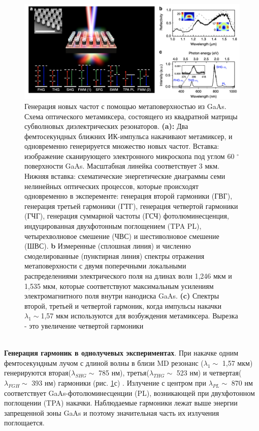 \begin{figure}[h!]
	\centering
	\includegraphics[width=0.7\linewidth]{images/mixer.png}
	\caption{Генерация новых частот с помощью метаповерхностью из  GaAs. Схема оптического метамиксера, состоящего из квадратной матрицы субволновых диэлектрических резонаторов. \textbf{(a):} Два фемтосекундных ближних ИК-импульса накачивают метамиксер, и одновременно генерируется множество новых частот. Вставка: изображение сканирующего электронного микроскопа под углом 60 $^\circ$ поверхности GaAs. Масштабная линейка соответствует 3 мкм. Нижняя вставка: схематические энергетические диаграммы семи нелинейных оптических процессов, которые происходят одновременно в эксперементе: генерация второй гармоники (ГВГ), генерация третьей гармоники (ГТГ), генерация четвертой гармоники (ГЧГ), генерация суммарной частоты (ГСЧ) фотолюминесценция, индуцированная двухфотонным поглощением (TPA PL), четырехволновое смешение (ЧВС) и шестиволновое смешение (ШВС). \textbf{b} Измеренные (сплошная линия) и численно смоделированные (пунктирная линия) спектры отражения метаповерхности с двумя поперечными локальными распределениями электрического поля на длинах волн 1,246 мкм и 1,535 мкм, которые соответствуют максимальным усилениям электромагнитного поля внутри нанодиска GaAs. \textbf{(c)} Спектры второй, третьей и четвертой гармоник, когда импульсы накачки $\lambda_1 \sim $1,57 мкм используются для возбуждения метамиксера. Вырезка - это увеличение четвертой гармоники \cite{liu2018all}}
	\label{mixerPictr1}
\end{figure}
\\
\hspace*{2mm}
\textbf{Генерация гармоник в однолучевых экспериментах}. При накачке одним фемтосекундным лучом с длиной волны в близи MD резонанс ($\lambda_1 \sim$ 1,57 мкм)  генерируются вторая($\lambda_{SHG} \sim$ 785 нм), третья($\lambda_{THG} \sim$ 523 нм) и четвертая($\lambda_{FGH} \sim$ 393 нм) гармоники (рис. \ref{mixerPictr1}с) . Излучение с центром при $\lambda_{PL} \sim$ 870 нм соответствует GaAs-фотолюминесценции (PL), возникающей при двухфотонном поглощении (TPA) накачки. Наблюдаемые гармоники лежат выше энергии запрещенной зоны GaAs и поэтому значительная часть их излучения поглощается.
